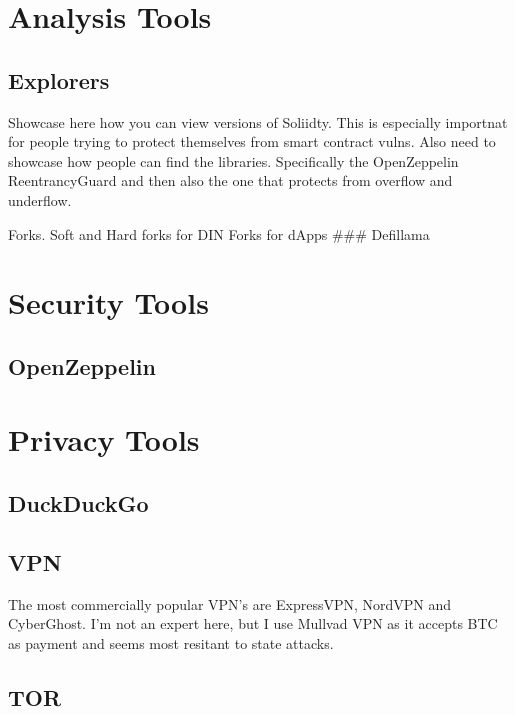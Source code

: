 \documentclass[
  letterpaper,
  DIV=11,
  numbers=noendperiod]{scrreprt}
\begin{document}
\section{Analysis Tools}\label{analysis-tools}

\subsection{Explorers}\label{explorers}

Showcase here how you can view versions of Soliidty. This is especially
importnat for people trying to protect themselves from smart contract
vulns. Also need to showcase how people can find the libraries.
Specifically the OpenZeppelin ReentrancyGuard and then also the one that
protects from overflow and underflow.

Forks. Soft and Hard forks for DIN Forks for dApps \#\#\# Defillama

\section{Security Tools}\label{security-tools}

\subsection{OpenZeppelin}\label{openzeppelin}

\section{Privacy Tools}\label{privacy-tools}

\subsection{DuckDuckGo}\label{duckduckgo}

\subsection{VPN}\label{vpn}

The most commercially popular VPN's are ExpressVPN, NordVPN and
CyberGhost. I'm not an expert here, but I use Mullvad VPN as it accepts
BTC as payment and seems most resitant to state attacks.

\subsection{TOR}\label{tor}
\end{document}

